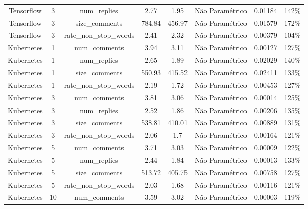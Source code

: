 \documentclass[12pt,openany,oneside,a4paper,english,brazil]{abntbibufjf}
\begin{document}
\begin{table}[htbp]
{\begin{tabular}{|c|c|c|c|c|c|c|c|}
Tensorflow & 3  & num\_replies           & 2.77               & 1.95                   & Não Paramétrico & 0.01184 & 142\%     \\
Tensorflow & 3  & size\_comments         & 784.84             & 456.97                 & Não Paramétrico & 0.01579 & 172\%     \\
Tensorflow & 3  & rate\_non\_stop\_words & 2.41               & 2.32                   & Não Paramétrico & 0.00379 & 104\%     \\
Kubernetes & 1  & num\_comments          & 3.94               & 3.11                   & Não Paramétrico & 0.00127 & 127\%     \\
Kubernetes & 1  & num\_replies           & 2.65               & 1.89                   & Não Paramétrico & 0.02029 & 140\%     \\
Kubernetes & 1  & size\_comments         & 550.93             & 415.52                 & Não Paramétrico & 0.02411 & 133\%     \\
Kubernetes & 1  & rate\_non\_stop\_words & 2.19               & 1.72                   & Não Paramétrico & 0.00453 & 127\%     \\
Kubernetes & 3  & num\_comments          & 3.81               & 3.06                   & Não Paramétrico & 0.00014 & 125\%     \\
Kubernetes & 3  & num\_replies           & 2.52               & 1.86                   & Não Paramétrico & 0.00206 & 135\%     \\
Kubernetes & 3  & size\_comments         & 538.81             & 410.01                 & Não Paramétrico & 0.00889 & 131\%     \\
Kubernetes & 3  & rate\_non\_stop\_words & 2.06               & 1.7                    & Não Paramétrico & 0.00164 & 121\%     \\
Kubernetes & 5  & num\_comments          & 3.71               & 3.03                   & Não Paramétrico & 0.00009 & 122\%     \\
Kubernetes & 5  & num\_replies           & 2.44               & 1.84                   & Não Paramétrico & 0.00013 & 133\%     \\
Kubernetes & 5  & size\_comments         & 513.72             & 405.75                 & Não Paramétrico & 0.00758 & 127\%     \\
Kubernetes & 5  & rate\_non\_stop\_words & 2.03               & 1.68                   & Não Paramétrico & 0.00116 & 121\%     \\
Kubernetes & 10 & num\_comments          & 3.59               & 3.02                   & Não Paramétrico & 0.00003 & 119\%     \\

\end{tabular}}
\end{table}
\end{document}
